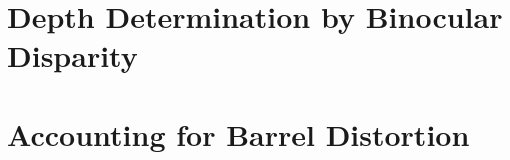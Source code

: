 \documentclass{article}
\begin{document}
\section{Depth Determination by Binocular Disparity}

\section{Accounting for Barrel Distortion}
\end{document}
